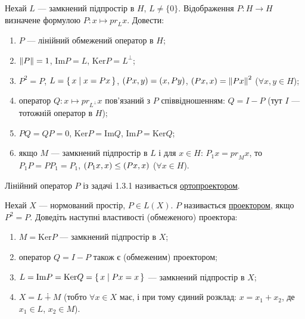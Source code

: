 
\begin{exercise}
    Нехай $L$ --- замкнений підпростір в $H$, $L \neq \{0\}$. 
    Відображення $P: H \rightarrow H$ визначене формулою 
    $P: x \mapsto {pr}_L x$. Довести:
    \begin{enumerate}[label=\ukr*)]
        \item $P$ --- лінійний обмежений оператор в $H$;
        \item $\left\lVert P\right\rVert = 1$, $\mathrm{Im}P = L$, $\mathrm{Ker} P = L^\bot$;
        \item $P^2 = P$, $L = \set{x \mid x=Px}$, $\left(Px, y\right)=\left(x, Py\right)$,
        $\left(Px, x\right) = \left\lVert Px\right\rVert^2$ ($\forall x,y \in H$);
        \item оператор $Q: x \mapsto {pr}_{L^\bot}x$ пов'язаний з $P$ 
        співвідношенням: $Q = I-P$ (тут $I$ --- тотожній оператор в $H$);
        \item $PQ = QP = 0$, $\mathrm{Ker}P = \mathrm{Im}Q$, $\mathrm{Im}P = \mathrm{Ker}Q$;
        \item якщо $M$ --- замкнений підпростір в $L$ і для $x \in H$:
        $P_1 x = {pr}_M x$, то $P_1 P = P P_1 = P_1$,
        $\left(P_1x, x\right) \leq \left(Px, x\right)$ ($\forall x \in H$).
    \end{enumerate}
\end{exercise}

\begin{theory}
    Лінійний оператор $P$ із задачі 1.3.1 називається \uline{ортопроектором}.
\end{theory}

\begin{exercise}
    Нехай $X$ --- нормований простір, $P \in L(X)$.
    $P$ називається \uline{проектором}, якщо $P^2=P$. Доведіть наступні 
    властивості (обмеженого) проектора:
    \begin{enumerate}[label=\ukr*)]
        \item $M = \mathrm{Ker}P$ --- замкнений підпростір в $X$;
        \item оператор $Q = I - P$ також є (обмеженим) проектором;
        \item $L=\mathrm{Im}P=\mathrm{Ker}Q=\set{x \mid Px=x}$ --- замкнений підпростір в $X$;
        \item $X = L \dotplus M$ (тобто $\forall x \in X$ має, і при тому 
        єдиний розклад: $x=x_1+x_2$, де $x_1 \in L$, $x_2 \in M$).
    \end{enumerate}
\end{exercise}

